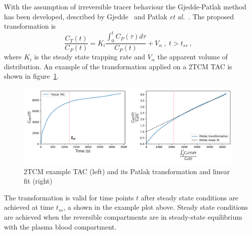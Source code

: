 With the assumption of irreversible tracer behaviour the Gjedde-Patlak method has been developed, described by Gjedde~\cite{Gjedde1982} and Patlak \textit{et al.}~\cite{Patlak1985}. The proposed transformation is
%
\begin{equation}
\label{eqn:PatlakModel}
\frac{C_{T}(t)}{C_{P}(t)} = K_i \frac{\int_{0}^{t} C_{P}(\tau) d\tau}{ C_{P}(t)} + V_{\alpha}   \ , \;  t>t_{ss} \ ,
\end{equation}
%
where $K_i$ is the steady state trapping rate and $V_{\alpha}$ the apparent volume of distribution.
An example of the transformation applied on a 2TCM TAC is shown in figure~\ref{fig:2TCM_Patlak_Example}.
\begin{figure}[ht!]
	\includegraphics[width=1\textwidth]{2_Theory_Methods/figures/ExamplePatlak.png}
	\centering
	\caption{2TCM example TAC (left) and its Patlak transformation and linear fit (right)}
	\centering
	\label{fig:2TCM_Patlak_Example}
\end{figure}

The transformation is valid for time points $t$ after steady state conditions are achieved at time $t_{ss}$, a shown in the example plot above. Steady state conditions are achieved when the reversible compartments are in steady-state equilibrium with the plasma blood compartment. 

